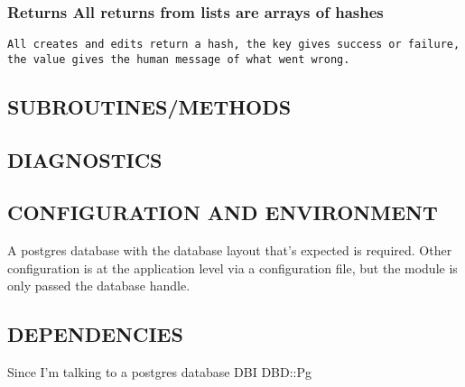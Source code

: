 \documentclass{book}
\begin{document}
\subsubsection{Returns All returns from lists are arrays of hashes}
\label{Inventory_Returns_All_returns_from_lists_are_arrays_of_hashes}
\hypertarget{Inventory_Returns_All_returns_from_lists_are_arrays_of_hashes}{}


\begin{lstlisting}[frame=lines,gobble=1]
 All creates and edits return a hash, the key gives success or failure, the value gives the human message of what went wrong.
\end{lstlisting}


\subsection{SUBROUTINES/METHODS}
\label{Inventory_SUBROUTINES_METHODS}
\hypertarget{Inventory_SUBROUTINES_METHODS}{}


\subsection{DIAGNOSTICS}
\label{Inventory_DIAGNOSTICS}
\hypertarget{Inventory_DIAGNOSTICS}{}


\subsection{CONFIGURATION AND ENVIRONMENT}
\label{Inventory_CONFIGURATION_AND_ENVIRONMENT}
\hypertarget{Inventory_CONFIGURATION_AND_ENVIRONMENT}{}



A postgres database with the database layout that's expected is required. Other configuration is at the application level via a configuration file, but the module is only passed the database handle.


\subsection{DEPENDENCIES}
\label{Inventory_DEPENDENCIES}
\hypertarget{Inventory_DEPENDENCIES}{}



Since I'm talking to a postgres database DBI DBD::Pg
\end{document}
